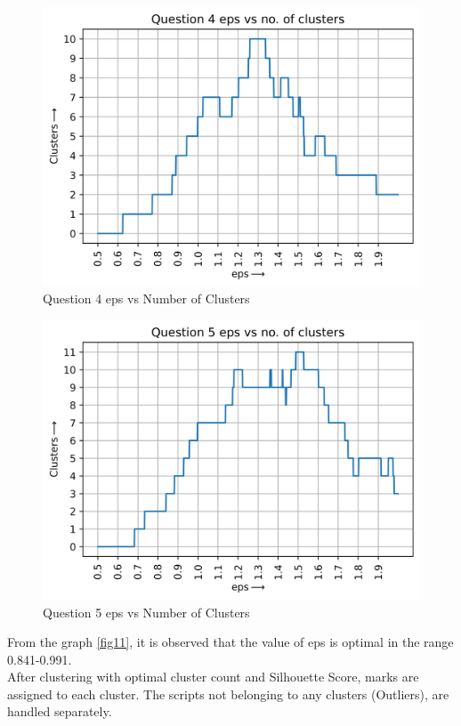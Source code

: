 \begin{figure}[H]
    \centering
    \includegraphics[width=0.75\linewidth]{IMAGE/q4_eps&clusters.png}
    \caption{Question 4 eps vs Number of Clusters}
    \label{fig24}
\end{figure}

\begin{figure}[H]
    \centering
    \includegraphics[width=0.75\linewidth]{IMAGE/q5_eps&clusters.png}
    \caption{Question 5 eps vs Number of Clusters}
    \label{fig25}
\end{figure}

From the graph \ref{fig11}, it is observed that the value of eps is optimal in the range 0.841-0.991.\\

After clustering with optimal cluster count and Silhouette Score, marks are assigned to each cluster. The scripts not belonging to any clusters (Outliers), are handled separately. 

